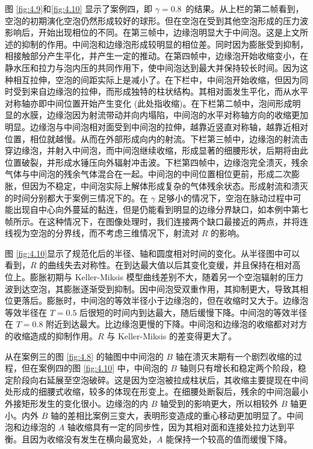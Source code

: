 图 \ref{fig:4.9}和\ref{fig:4.10} 显示了案例四，即 $\gamma =0.8\,$
的结果。从上栏的第二帧看到，空泡的初期演化空泡仍然形成较好的球形。但在空泡在受到其他空泡形成的压力波影响后，开始出现相位的不同。在第三帧中，边缘泡明显大于中间泡。这是上文所述的抑制的作用。中间泡和边缘泡形成较明显的相位差。同时因为膨胀受到抑制，相接触部分产生平化，并产生一定的推动。在第四帧中，边缘泡开始收缩变小，在静水压和拉力与泡内压的共同作用下，使中间泡达到最大并保持较长时间。因为这种相互拉伸，空泡的间距实际上是减小了。在下栏中，中间泡开始收缩，但因为同时受到来自边缘泡的拉伸，而形成独特的柱状结构。其相对面发生平化，而从水平对称轴亦即中间位置开始产生变化
(此处指收缩)。在下栏第二帧中，泡间形成明显的水膜，边缘泡因为射流带动并向内塌陷，中间泡的水平对称轴方向的收缩更加明显。边缘泡与中间泡相对面受到中间泡的拉伸，越靠近竖直对称轴，越靠近相对位置，相位就越慢。从而在外部形成向内的射流。下栏第三帧中，边缘泡的射流击穿边缘泡，并射入中间泡，而中间泡继续收缩，形成显著的细腰形状，后期将由此位置破裂，并形成水锤压向外辐射冲击波。下栏第四帧中，边缘泡完全溃灭，残余气体与中间泡的残余气体混合在一起。中间泡的中间位置相位更前，形成二次膨胀，但因为不稳定，中间泡实际上解体形成复杂的气体残余状态。形成射流和溃灭的时间分别都大于案例三情况下的。在
$\gamma$
足够小的情况下，空泡在脉动过程中可能出现自中心向外蔓延的黏连，但是仍能看到明显的边缘分界缺口，如本例中第七帧所示。在这种情况下，在图像处理时，我们连接两个缺口最接近的两点，并将连线视为空泡的分界线，而不考虑三维情况下，射流对
$R$ 的影响。

图 \ref{fig:4.10}显示了规范化后的半径、轴和圆度相对时间的变化。从半径图中可以看到，$R$
的曲线失去对称性。在到达最大值以后其变化变缓，并且保持在相对高位上。膨胀初期与
Keller-Miksis
模型曲线差别不大，随着另一个空泡辐射的压力波到达空泡，其膨胀逐渐受到抑制。因中间泡受双重作用，其抑制更大，导致其相位更落后。膨胀时，中间泡的等效半径小于边缘泡的，但在收缩时又大于。边缘泡等效半径在
$T=0.5$ 后很短的时间内到达最大，随后缓慢下降。中间泡的等效半径在
$T=0.8$
附近到达最大。比边缘泡更慢的下降。中间泡和边缘泡的收缩都对对方的收缩造成的抑制作用。$R$
与 Keller-Miksis 的差变得更大了。

从在案例三的图 \ref{fig:4.8} 的轴图中中间泡的 $B$
轴在溃灭末期有一个剧烈收缩的过程，但在案例四的图  \ref{fig:4.10} 中，中间泡的 $B$
轴则只有增长和稳定两个阶段，稳定阶段向右延展至空泡破碎。这是因为空泡被拉成柱状后，其收缩主要提现在中间处形成的细腰式收缩，较多的体现在形变上。在细腰处断裂后，残余的中间泡最小外接矩形发生的变化很小。边缘泡的内
$B$ 轴受到的影响更大，所以相较外 $B$ 轴更小。内外 $B$
轴的差相比案例三变大，表明形变造成的重心移动更加明显了。中间泡和边缘泡的
$A$
轴收缩具有一定的同步性，因为其相对面和连接处拉力达到平衡。且因为收缩没有发生在横向最宽处，$A$
能保持一个较高的值而缓慢下降。

